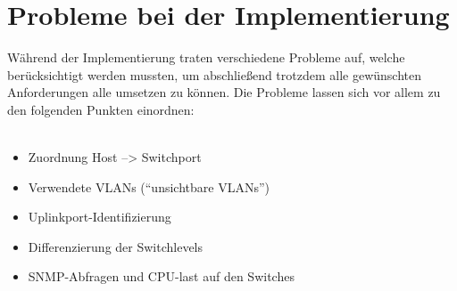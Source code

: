 \section{Probleme bei der Implementierung}
\label{sec:probimp}

Während der Implementierung traten verschiedene Probleme auf, welche berücksichtigt werden mussten, um abschließend trotzdem alle gewünschten Anforderungen alle umsetzen zu können.
Die Probleme lassen sich vor allem zu den folgenden Punkten einordnen:\\
\\
\begin{itemize}
\item Zuordnung Host --> Switchport\\
\item Verwendete VLANs (“unsichtbare VLANs”)\\
\item Uplinkport-Identifizierung\\
\item Differenzierung der Switchlevels\\
\item SNMP-Abfragen und CPU-last auf den Switches\\
\end{itemize}


